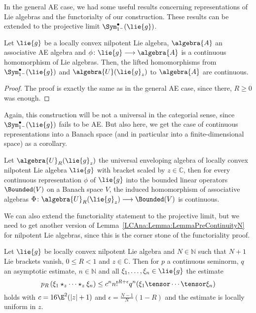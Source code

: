 In the general AE case, we had some useful results concerning representations 
of Lie algebras and the functorialty of our construction. These results can be 
extended to the projective limit $\Sym_{1^-}^{\bullet}(\lie{g})$.
\begin{proposition}
	\label{Nilpot:Prop:UnivProperty}
	Let $\lie{g}$ be a locally convex nilpotent Lie algebra, $\algebra{A}$ an 
	associative AE algebra and $\phi \colon \lie{g} \longrightarrow 
	\algebra{A}$ is a continuous homomorphism of Lie algebras. Then, the 
	lifted homomorphisms from $\Sym_{1^-}^{\bullet}(\lie{g})$ and 
	$\algebra{U}(\lie{g}_z)$ to $\algebra{A}$ are continuous.
\end{proposition}
\begin{proof}
	The proof is exactly the same as in the general AE case, since there, 
	$R \geq 0$ was enough.
\end{proof}
Again, this construction will be not a universal in the categorial sense, 
since $\Sym_{1^-}^{\bullet}(\lie{g})$ fails to be AE. But also here, we get 
the case of continuous representations into a Banach space (and in particular 
into a finite-dimensional space) as a corollary.
\begin{corollary}
    \label{Nilpot:Coro:ContinuousRepresentations}%
    Let $\algebra{U}_R(\lie{g}_z)$ the universal enveloping algebra of locally 
    convex nilpotent Lie algebra $\lie{g}$ with bracket scaled by $z \in 
    \mathbb{C}$, then for every continuous 
    representation $\phi$ of $\lie{g}$ into the bounded linear operators 
    $\Bounded(V)$ on a Banach space $V$, the induced homomorphism of 
    associative algebras $\Phi \colon \algebra{U}_R(\lie{g}_z) \longrightarrow 
    \Bounded(V)$ is continuous.
\end{corollary}
We can also extend the functoriality statement to the projective limit, but we 
need to get another version of Lemma~\ref{LCAna:Lemma:LemmaPreContinuityN} for 
nilpotent Lie algebras, since this is the corner stone of the functoriality 
proof.
\begin{lemma}
    \label{Lemma:Nilpot:LemmaPreContinuityN}%
    Let $\lie{g}$ be locally convex nilpotent Lie algebra and $N \in 
    \mathbb{N}$ such that $N + 1$ Lie brackets vanish, $0 \leq R < 1$ and 
    $z \in \mathbb{C}$. Then for $p$ a continuous seminorm, $q$ an
    asymptotic estimate, $n \in \mathbb{N}$ and all $\xi_1, \ldots,
    \xi_n \in \lie{g}$ the estimate
    \begin{equation}
        \label{Nilpot:LemmaPreContinuityN}
        p_R \left(
            \xi_1 \star_z \cdots \star_z \xi_n
        \right)
        \leq
        c^n n!^{R + \epsilon}
        q^n(\xi_1 \tensor \cdots \tensor \xi_n)
    \end{equation}
    holds with $c = 16 \E^2 (|z| + 1)$ and $\epsilon = \frac{N-1}{N}(1 - R)$
    and the estimate is locally uniform in $z$.
\end{lemma}

